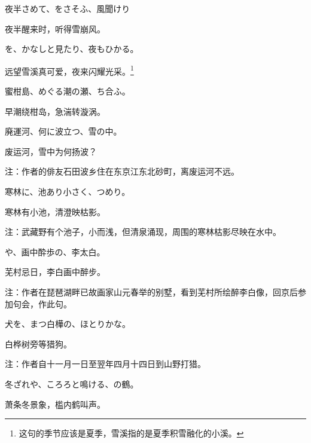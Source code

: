 \begin{haiku}
    {\FH 夜半さめて、をさそふ、風聞けり}

    {\FK 夜半醒来时，听得雪崩风。}
\end{haiku}

\begin{haiku}
    {\FH {}を、かなしと見たり、夜もひかる。}

    {\FK 远望雪溪真可爱，夜来闪耀光采。\footnote{\FT 这句的季节应该是夏季，雪溪指的是夏季积雪融化的小溪。}}
\end{haiku}

\begin{haiku}
    {\FH 蜜柑島、めぐる潮の瀬、ち合ふ。}

    {\FK 早潮绕柑岛，急湍转漩涡。}
\end{haiku}

\begin{haiku}
    {\FH 廃運河、何に波立つ、雪の中。}

    {\FK 废运河，雪中为何扬波？}

    {\FT 注：作者的俳友石田波乡住在东京江东北砂町，离废运河不远。}
\end{haiku}

\begin{haiku}
    {\FH 寒林に、池あり小さく、つめり。}

    {\FK 寒林有小池，清澄映枯影。}

    {\FT 注：武藏野有个池子，小而浅，但清泉涌现，周围的寒林枯影尽映在水中。}
\end{haiku}

\begin{haiku}
    {\FH {}や、画中酔歩の、李太白。}

    {\FK 芜村忌日，李白画中醉步。}

    {\FT 注：作者在琵琶湖畔已故画家山元春举的别墅，看到芜村所绘醉李白像，回京后参加句会，作此句。}
\end{haiku}

\begin{haiku}
    {\FH {}犬を、まつ白樺の、ほとりかな。}

    {\FK 白桦树旁等猎狗。}

    {\FT 注：作者自十一月一日至翌年四月十四日到山野打猎。}
\end{haiku}

\begin{haiku}
    {\FH 冬ざれや、ころろと鳴ける、の鶴。}

    {\FK 萧条冬景象，槛内鹤叫声。}
\end{haiku}

